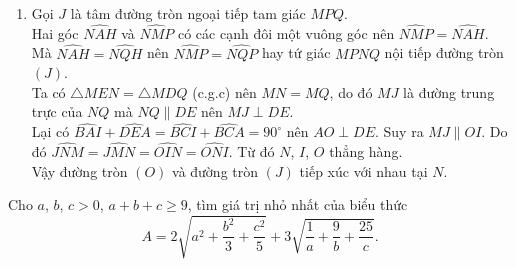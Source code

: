 \begin{ex}
{\begin{enumerate}
\item Gọi $J$ là tâm đường tròn ngoại tiếp tam giác $MPQ$.\\
Hai góc $\widehat{NAH}$ và $\widehat{NMP}$ có các cạnh đôi một vuông góc nên $\widehat{NMP}=\widehat{NAH}$. Mà $\widehat{NAH}=\widehat{NQH}$ nên $\widehat{NMP}=\widehat{NQP}$ hay tứ giác $MPNQ$ nội tiếp đường tròn $(J)$.\\
Ta có $\triangle MEN=\triangle MDQ$ (c.g.c) nên $MN=MQ$, do đó $MJ$ là đường trung trực của $NQ$ mà $NQ\parallel DE$ nên $MJ\perp DE$.\\
Lại có $\widehat{BAI}+\widehat{DEA}=\widehat{BCI}+\widehat{BCA}=90^\circ$ nên $AO\perp DE$. Suy ra $MJ\parallel OI$. Do đó $\widehat{JNM}=\widehat{JMN}=\widehat{OIN}=\widehat{ONI}$. Từ đó $N$, $I$, $O$ thẳng hàng.\\
Vậy đường tròn $(O)$ và đường tròn $(J)$ tiếp xúc với nhau tại $N$.
\end{enumerate}
}
\end{ex}

\begin{ex}%
Cho $a$, $b$, $c >0$, $a+b+c\ge 9$, tìm giá trị nhỏ nhất của biểu thức $$A=2\sqrt{a^2+\dfrac{b^2}{3}+\dfrac{c^2}{5}}+3\sqrt{\dfrac{1}{a}+\dfrac{9}{b}+\dfrac{25}{c}}.$$
\end{ex}

